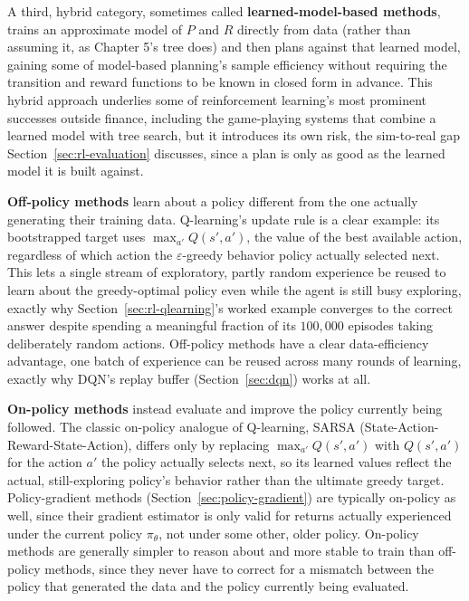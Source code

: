 \documentclass[../ai_in_finance]{subfiles}
\begin{document}
A third, hybrid category, sometimes called \textbf{learned-model-based methods}, trains an approximate model of $P$ and $R$ directly from data (rather than assuming it, as Chapter 5's tree does) and then plans against that learned model, gaining some of model-based planning's sample efficiency without requiring the transition and reward functions to be known in closed form in advance. This hybrid approach underlies some of reinforcement learning's most prominent successes outside finance, including the game-playing systems that combine a learned model with tree search, but it introduces its own risk, the sim-to-real gap Section~\ref{sec:rl-evaluation} discusses, since a plan is only as good as the learned model it is built against.

\textbf{Off-policy methods} learn about a policy different from the one actually generating their training data. Q-learning's update rule is a clear example: its bootstrapped target uses $\max_{a'} Q(s',a')$, the value of the best available action, regardless of which action the $\varepsilon$-greedy behavior policy actually selected next. This lets a single stream of exploratory, partly random experience be reused to learn about the greedy-optimal policy even while the agent is still busy exploring, exactly why Section~\ref{sec:rl-qlearning}'s worked example converges to the correct answer despite spending a meaningful fraction of its $100{,}000$ episodes taking deliberately random actions. Off-policy methods have a clear data-efficiency advantage, one batch of experience can be reused across many rounds of learning, exactly why DQN's replay buffer (Section~\ref{sec:dqn}) works at all.

\textbf{On-policy methods} instead evaluate and improve the policy currently being followed. The classic on-policy analogue of Q-learning, SARSA (State-Action-Reward-State-Action), differs only by replacing $\max_{a'} Q(s',a')$ with $Q(s',a')$ for the action $a'$ the policy actually selects next, so its learned values reflect the actual, still-exploring policy's behavior rather than the ultimate greedy target. Policy-gradient methods (Section~\ref{sec:policy-gradient}) are typically on-policy as well, since their gradient estimator is only valid for returns actually experienced under the current policy $\pi_\theta$, not under some other, older policy. On-policy methods are generally simpler to reason about and more stable to train than off-policy methods, since they never have to correct for a mismatch between the policy that generated the data and the policy currently being evaluated.
\end{document}
